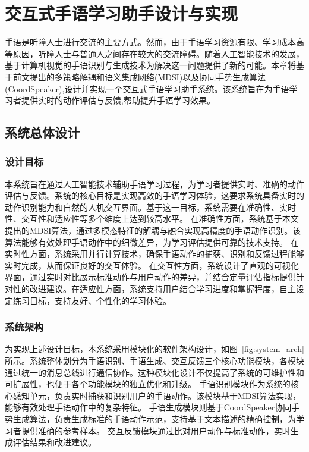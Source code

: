 
\chapter{交互式手语学习助手设计与实现}
手语是听障人士进行交流的主要方式。然而，由于手语学习资源有限、学习成本高等原因，听障人士与普通人之间存在较大的交流障碍。随着人工智能技术的发展，基于计算机视觉的手语识别与生成技术为解决这一问题提供了新的可能。本章将基于前文提出的多策略解耦和语义集成网络(MDSI)以及协同手势生成算法(CoordSpeaker),设计并实现一个交互式手语学习助手系统。该系统旨在为手语学习者提供实时的动作评估与反馈,帮助提升手语学习效果。

\section{系统总体设计}

\subsection{设计目标}
本系统旨在通过人工智能技术辅助手语学习过程，为学习者提供实时、准确的动作评估与反馈。系统的核心目标是实现高效的手语学习体验，这要求系统具备实时的动作识别能力和自然的人机交互界面。基于这一目标，系统需要在准确性、实时性、交互性和适应性等多个维度上达到较高水平。
在准确性方面，系统基于本文提出的MDSI算法，通过多模态特征的解耦与融合实现高精度的手语动作识别。该算法能够有效处理手语动作中的细微差异，为学习评估提供可靠的技术支持。
在实时性方面，系统采用并行计算技术，确保手语动作的捕获、识别和反馈过程能够实时完成，从而保证良好的交互体验。
在交互性方面，系统设计了直观的可视化界面，通过实时对比展示标准动作与用户动作的差异，并结合定量评估指标提供针对性的改进建议。在适应性方面，系统支持用户结合学习进度和掌握程度，自主设定练习目标，支持友好、个性化的学习体验。

\subsection{系统架构}
为实现上述设计目标，本系统采用模块化的软件架构设计，如图~\ref{fig:system_arch}所示。系统整体划分为手语识别、手语生成、交互反馈三个核心功能模块，各模块通过统一的消息总线进行通信协作。这种模块化设计不仅提高了系统的可维护性和可扩展性，也便于各个功能模块的独立优化和升级。
手语识别模块作为系统的核心感知单元，负责实时捕获和识别用户的手语动作。该模块基于MDSI算法实现，能够有效处理手语动作中的复杂特征。
手语生成模块则基于CoordSpeaker协同手势生成算法，负责生成标准的手语动作示范，支持基于文本描述的精确控制，为学习者提供准确的参考样本。
交互反馈模块通过比对用户动作与标准动作，实时生成评估结果和改进建议。%


